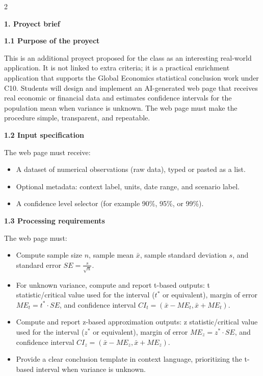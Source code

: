 \documentclass[12pt]{article}
\newcommand{\SubsectionBox}[1]{%
	\noindent\colorbox{gray!30}{%
		\parbox{\linewidth}{\textbf{#1}}%
	}\par\vspace{0.35cm}%
}
\begin{document}
	\begin{multicols}{2}
		
		\vspace{0.25cm}
		\SubsectionBox{1. Proyect brief}\vspace{-0.25cm}
		
		\textbf{1.1 Purpose of the proyect}\par
		This is an additional proyect proposed for the class as an interesting real-world application.
		It is not linked to extra criteria; it is a practical enrichment application that supports the Global Economics statistical conclusion work under C10.
		Students will design and implement an AI-generated web page that receives real economic or financial data and estimates confidence intervals for the population mean when variance is unknown.
		The web page must make the procedure simple, transparent, and repeatable.
		
		\textbf{1.2 Input specification}\par
		The web page must receive:
		\begin{itemize}
			\item A dataset of numerical observations (raw data), typed or pasted as a list.
			\item Optional metadata: context label, units, date range, and scenario label.
			\item A confidence level selector (for example 90\%, 95\%, or 99\%).
		\end{itemize}
		
		\textbf{1.3 Processing requirements}\par
		The web page must:
		\begin{itemize}
			\item Compute sample size $n$, sample mean $\bar{x}$, sample standard deviation $s$, and standard error $SE=\frac{s}{\sqrt{n}}$.
			\item For unknown variance, compute and report t-based outputs: t statistic/critical value used for the interval ($t^*$ or equivalent), margin of error $ME_t=t^*\cdot SE$, and confidence interval $CI_t=(\bar{x}-ME_t,\bar{x}+ME_t)$.
			\item Compute and report z-based approximation outputs: z statistic/critical value used for the interval ($z^*$ or equivalent), margin of error $ME_z=z^*\cdot SE$, and confidence interval $CI_z=(\bar{x}-ME_z,\bar{x}+ME_z)$.
			\item Provide a clear conclusion template in context language, prioritizing the t-based interval when variance is unknown.
		\end{itemize}
		

\end{multicols}
\end{document}
